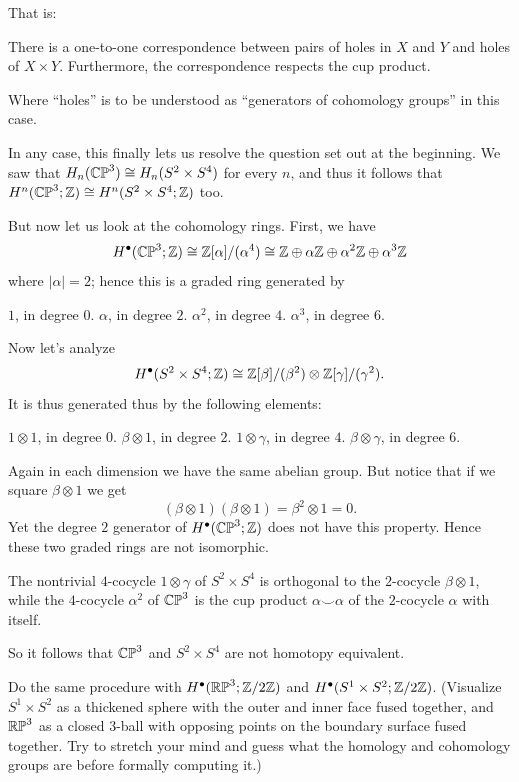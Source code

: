 That is:
\begin{moral}
	There is a one-to-one correspondence between pairs of holes in $X$ and $Y$
	and holes of $X \times Y$.
	Furthermore, the correspondence respects the cup product.
\end{moral}
Where ``holes'' is to be understood as ``generators of cohomology groups'' in this case.

In any case, this finally lets us resolve the question
set out at the beginning.
We saw that $H_n(\mathbb{CP}^3) \cong H_n(S^2 \times S^4)$ for every $n$,
and thus it follows that $H^n(\mathbb{CP}^3; \mathbb Z) \cong H^n(S^2 \times S^4; \mathbb Z)$ too.

But now let us look at the cohomology rings. First, we have
\[ H^\bullet(\mathbb{CP}^3; \mathbb Z) \cong \mathbb Z[\alpha] / (\alpha^4)
	\cong \mathbb Z \oplus \alpha\mathbb Z \oplus \alpha^2\mathbb Z \oplus \alpha^3\mathbb Z
\]
where $|\alpha| = 2$; hence this is a graded ring generated by
\begin{itemize}
	\ii $1$, in degree $0$.
	\ii $\alpha$, in degree $2$.
	\ii $\alpha^2$, in degree $4$.
	\ii $\alpha^3$, in degree $6$.
\end{itemize}

Now let's analyze
\[ H^\bullet(S^2 \times S^4; \mathbb Z) \cong
	\mathbb Z[\beta] / (\beta^2)
	\otimes
	\mathbb Z[\gamma] / (\gamma^2).
\]
It is thus generated thus by the following elements:
\begin{itemize}
	\ii $1 \otimes 1$, in degree $0$.
	\ii $\beta \otimes 1$, in degree $2$.
	\ii $1 \otimes \gamma$, in degree $4$.
	\ii $\beta \otimes \gamma$, in degree $6$.
\end{itemize}
Again in each dimension we have the same abelian group.
But notice that if we square $\beta \otimes 1$ we get
\[ (\beta \otimes 1)(\beta \otimes 1) = \beta^2 \otimes 1 = 0. \]
Yet the degree $2$ generator of $H^\bullet(\mathbb{CP}^3; \mathbb Z)$
does not have this property.
Hence these two graded rings are not isomorphic.

\begin{moral}
	The nontrivial $4$-cocycle $1 \otimes \gamma$ of $S^2 \times S^4$ is orthogonal to the
	$2$-cocycle $\beta \otimes 1$, while the $4$-cocycle $\alpha^2$ of $\mathbb{CP}^3$ is the cup product
	$\alpha \smile \alpha$ of the $2$-cocycle $\alpha$ with itself.
\end{moral}

So it follows that $\mathbb{CP}^3$ and $S^2 \times S^4$ are not homotopy equivalent.

\begin{exercise}
	Do the same procedure with $H^\bullet(\mathbb{RP}^3; \mathbb Z/2\mathbb Z)$ and $H^\bullet(S^1 \times S^2; \mathbb Z/2\mathbb Z)$.
	(Visualize $S^1 \times S^2$ as a thickened sphere with the outer and inner face fused together,
	and $\mathbb{RP}^3$ as a closed $3$-ball with opposing points on the boundary surface fused together.
	Try to stretch your mind and guess what the homology and cohomology groups are before formally
	computing it.)
\end{exercise}

